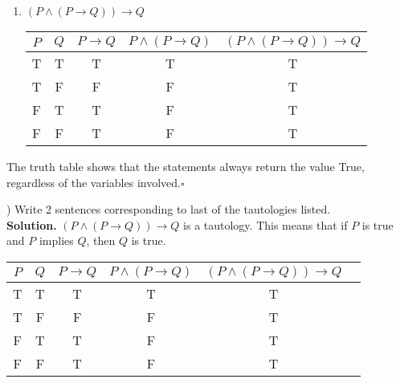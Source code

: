 \documentclass[11pt]{article}
\begin{document}
\begin{enumerate}
	\item $(P \wedge(P \rightarrow Q)) \rightarrow Q$
	      \begin{center}
		      \begin{tabular}{|c|c|c|c|c|}
			      \hline
			      $P$ & $Q$ & $P \rightarrow Q$ & $P \wedge(P \rightarrow Q)$ & $(P \wedge(P \rightarrow Q)) \rightarrow Q$ \\
			      \hline
			      T   & T   & T                 & T                           & T                                           \\
			      T   & F   & F                 & F                           & T                                           \\
			      F   & T   & T                 & F                           & T                                           \\
			      F   & F   & T                 & F                           & T                                           \\
			      \hline
		      \end{tabular}
	      \end{center}
\end{enumerate}

The truth table shows that the statements always return the value True, regardless of the variables involved.\qquad $\square$

\vspace{10pt}
) Write 2 sentences corresponding to last of the tautologies listed.\\
\textbf{Solution. }
\noindent $(P \wedge(P \rightarrow Q)) \rightarrow Q$ is a tautology. This means that if $P$ is true and $P$ implies $Q$, then $Q$ is true.
\begin{center}
	\begin{tabular}{|c|c|c|c|c|c|}
		\hline
		$P$ & $Q$ & $P \rightarrow Q$ & $P \wedge(P \rightarrow Q)$ & $(P \wedge(P \rightarrow Q)) \rightarrow Q$ \\
		\hline
		T   & T   & T                 & T                           & T                                           \\
		T   & F   & F                 & F                           & T                                           \\
		F   & T   & T                 & F                           & T                                           \\
		F   & F   & T                 & F                           & T                                           \\
		\hline
	\end{tabular}
\end{center}
\end{document}
